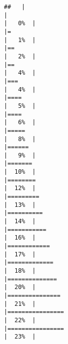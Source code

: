 \documentclass[
]{article}
\begin{document}
\begin{verbatim}
##   |                                                                              |                                                                      |   0%  |                                                                              |=                                                                     |   1%  |                                                                              |==                                                                    |   2%  |                                                                              |==                                                                    |   4%  |                                                                              |===                                                                   |   4%  |                                                                              |====                                                                  |   5%  |                                                                              |====                                                                  |   6%  |                                                                              |=====                                                                 |   8%  |                                                                              |======                                                                |   9%  |                                                                              |=======                                                               |  10%  |                                                                              |========                                                              |  12%  |                                                                              |=========                                                             |  13%  |                                                                              |==========                                                            |  14%  |                                                                              |===========                                                           |  16%  |                                                                              |============                                                          |  17%  |                                                                              |=============                                                         |  18%  |                                                                              |==============                                                        |  20%  |                                                                              |===============                                                       |  21%  |                                                                              |================                                                      |  22%  |                                                                              |================                                                      |  23%  |                                                                              
\end{verbatim}
\end{document}
